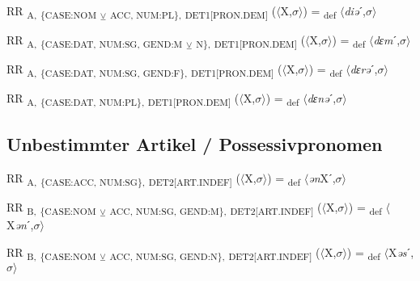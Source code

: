 {\begin{exe}
 RR \textsubscript{A,} \textsubscript{\{CASE:NOM} \textsubscript{${\veebar}$}\textsubscript{ ACC, NUM:PL\},} \textsubscript{DET1[PRON.DEM]} ($\langle$X,$\sigma $$\rangle$) = \textsubscript{def} $\langle$\textit{diə}ˊ,$\sigma $$\rangle$
\end{exe}

\begin{exe}
 RR \textsubscript{A,} \textsubscript{\{CASE:DAT, NUM:SG, GEND:M} \textsubscript{${\veebar}$}\textsubscript{ N\},} \textsubscript{DET1[PRON.DEM]} ($\langle$X,$\sigma $$\rangle$) = \textsubscript{def} $\langle$\textit{dɛm}ˊ,$\sigma $$\rangle$
\end{exe}

\begin{exe}
 RR \textsubscript{A,} \textsubscript{\{CASE:DAT, NUM:SG, GEND:F\},} \textsubscript{DET1[PRON.DEM]} ($\langle$X,$\sigma $$\rangle$) = \textsubscript{def} $\langle$\textit{dɛrə}ˊ,$\sigma $$\rangle$
\end{exe}

\begin{exe}
 RR \textsubscript{A,} \textsubscript{\{CASE:DAT, NUM:PL\},} \textsubscript{DET1[PRON.DEM]} ($\langle$X,$\sigma $$\rangle$) = \textsubscript{def} $\langle$\textit{dɛnə}ˊ,$\sigma $$\rangle$
\end{exe}

\subsection{Unbestimmter Artikel / Possessivpronomen}

\begin{exe}
 RR \textsubscript{A,} \textsubscript{\{CASE:ACC, NUM:SG\},} \textsubscript{DET2[ART.INDEF]} ($\langle$X,$\sigma $$\rangle$) = \textsubscript{def} $\langle$\textit{ən}Xˊ,$\sigma $$\rangle$
\end{exe}

\begin{exe}
 RR \textsubscript{B,} \textsubscript{\{CASE:NOM} \textsubscript{${\veebar}$}\textsubscript{ ACC, NUM:SG, GEND:M\},} \textsubscript{DET2[ART.INDEF]} ($\langle$X,$\sigma $$\rangle$) = \textsubscript{def} $\langle$X\textit{ən}ˊ,$\sigma $$\rangle$
\end{exe}

\begin{exe}
 RR \textsubscript{B,} \textsubscript{\{CASE:NOM} \textsubscript{${\veebar}$}\textsubscript{ ACC, NUM:SG, GEND:N\},} \textsubscript{DET2[ART.INDEF]} ($\langle$X,$\sigma $$\rangle$) = \textsubscript{def} $\langle$X\textit{əs}ˊ,$\sigma $$\rangle$
\end{exe}

}
